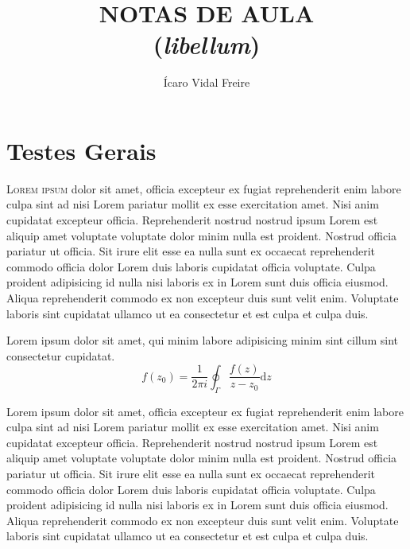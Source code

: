 \documentclass[12pt]{../libellum}
\title{
  \sffamily \bfseries
  NOTAS DE AULA \\
  (\textit{libellum})
}
\author{
  \sffamily
  Ícaro Vidal Freire
}
\date{
  \sffamily 
  2023
}
\begin{document}
 
  \maketitle
  \sumario
%
  \blinddocument
%
  \blindtext {}
  
  \chapter{Testes Gerais}
  \lettrine[lines=3]{\initial\color{azulUFRB} L}{orem ipsum} dolor sit amet, officia excepteur ex fugiat reprehenderit enim labore culpa sint ad nisi Lorem pariatur mollit ex esse exercitation amet. Nisi anim cupidatat excepteur officia. Reprehenderit nostrud nostrud ipsum Lorem est aliquip amet voluptate voluptate dolor minim nulla est proident. Nostrud officia pariatur ut officia. Sit irure elit esse ea nulla sunt ex occaecat reprehenderit commodo officia dolor Lorem duis laboris cupidatat officia voluptate. Culpa proident adipisicing id nulla nisi laboris ex in Lorem sunt duis officia eiusmod. Aliqua reprehenderit commodo ex non excepteur duis sunt velit enim. Voluptate laboris sint cupidatat ullamco ut ea consectetur et est culpa et culpa duis.



  \begin{teorema}
    Lorem ipsum dolor sit amet, qui minim labore adipisicing minim sint cillum sint consectetur cupidatat.
    \[
      f(z_0) = \frac{1}{2 \pi i} \oint_{\Gamma} \frac{f(z)}{z - z_0} \mathrm{d} z
    \]
  \end{teorema}
  
  Lorem ipsum dolor sit amet, officia excepteur ex fugiat reprehenderit enim labore culpa sint ad nisi Lorem pariatur mollit ex esse exercitation amet. Nisi anim cupidatat excepteur officia. Reprehenderit nostrud nostrud ipsum Lorem est aliquip amet voluptate voluptate dolor minim nulla est proident. Nostrud officia pariatur ut officia. Sit irure elit esse ea nulla sunt ex occaecat reprehenderit commodo officia dolor Lorem duis laboris cupidatat officia voluptate. Culpa proident adipisicing id nulla nisi laboris ex in Lorem sunt duis officia eiusmod. Aliqua reprehenderit commodo ex non excepteur duis sunt velit enim. Voluptate laboris sint cupidatat ullamco ut ea consectetur et est culpa et culpa duis.
\end{document}
